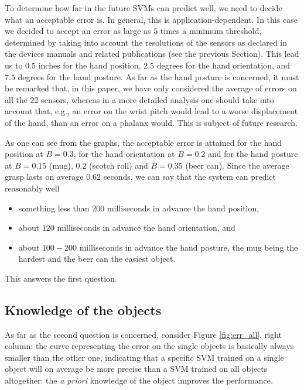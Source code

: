 To determine how far in the future SVMs can predict well, we need to
decide what an acceptable error is. In general, this is
application-dependent. In this case we decided to accept an error as
large as $5$ times a minimum threshold, determined by taking into
account the resolutions of the sensors as declared in the devices
manuals and related publications (see the previous Section). This lead
us to $0.5$ inches for the hand position, $2.5$ degrees for the hand
orientation, and $7.5$ degrees for the hand posture. As far as the
hand posture is concerned, it must be remarked that, in this paper, we
have only considered the average of errors on all the $22$ sensors,
whereas in a more detailed analysis one should take into account that,
e.g., an error on the wrist pitch would lead to a worse displacement
of the hand, than an error on a phalanx would. This is subject of
future research.

As one can see from the graphs, the acceptable error is attained for
the hand position at $B=0.3$, for the hand orientation at $B=0.2$ and
for the hand posture at $B=0.15$ (mug), $0.2$ (scotch roll) and
$B=0.35$ (beer can). Since the average grasp lasts on average $0.62$
seconds, we can say that the system can predict reasonably well

\begin{itemize}

  \item something less than $200$ milliseconds in advance the hand
    position,

  \item about $120$ milliseconds in advance the hand orientation, and

  \item about $100-200$ milliseconds in advance the hand posture, the
    mug being the hardest and the beer can the easiest object.

\end{itemize}

This answers the first question.

\subsection{Knowledge of the objects}

As far as the second question is concerned, consider Figure
\ref{fig:err_all}, right column: the curve representing the error on
the single objects is basically always smaller than the other one,
indicating that a specific SVM trained on a single object will on
average be more precise than a SVM trained on all objects altogether:
the \emph{a priori} knowledge of the object improves the
performance.

